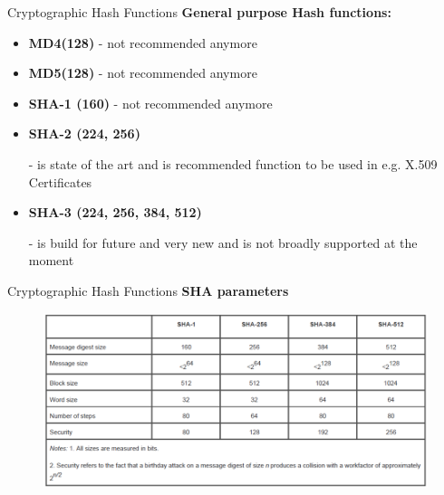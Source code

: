 \documentclass[pdf]{beamer}
\begin{document}
\begin{frame}{Cryptographic Hash Functions}
\textbf{General purpose Hash functions:}
\begin{itemize}
\item
\textbf{MD4(128)} - not recommended anymore

\item
\textbf{MD5(128)} - not recommended anymore

\item
\textbf{SHA-1 (160)} - not recommended anymore

\item
\textbf{SHA-2 (224, 256)}

- is state of the art and is recommended function to be used in e.g. X.509 Certificates

\item
\textbf{SHA-3 (224, 256, 384, 512)}

- is build for future and very new and is not broadly supported at the moment

\end{itemize}
\end{frame}



\begin{frame}{Cryptographic Hash Functions}
\textbf{SHA parameters}
\begin{figure}[t]
\centering
\includegraphics[scale=0.45]{Images/sha}
\end{figure}
\end{frame}
\end{document}
